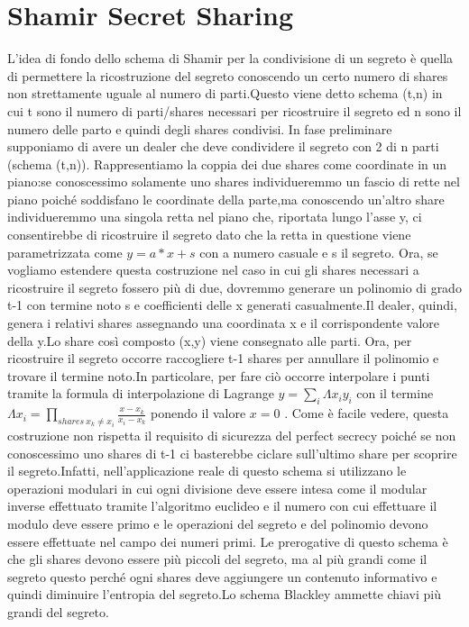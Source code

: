 \documentclass{book}
\begin{document}
\section{Shamir Secret Sharing}
L'idea di fondo dello schema di Shamir per la condivisione di un segreto è quella di permettere la ricostruzione del segreto conoscendo un certo numero di shares non strettamente uguale al numero di parti.Questo viene detto schema (t,n) in cui t sono il numero di parti/shares necessari per ricostruire il segreto ed n sono il numero delle parto e quindi degli shares condivisi\@.\newline
In fase preliminare supponiamo di avere un dealer che deve condividere il segreto con 2 di n parti (schema (t,n))\@.\newline
Rappresentiamo la coppia dei due shares come coordinate in un piano:se conoscessimo solamente uno shares individueremmo un fascio di rette nel piano poiché soddisfano le coordinate della parte,ma conoscendo un'altro share individueremmo una singola retta nel piano che, riportata lungo l'asse y, ci consentirebbe di ricostruire il segreto dato che la retta in questione viene parametrizzata come \(y=a*x+s\) con a numero casuale e s il segreto\@.\newline
Ora, se vogliamo estendere questa costruzione nel caso in cui gli shares necessari a ricostruire il segreto fossero più di due, dovremmo generare un polinomio di grado t-1 con termine noto s e coefficienti delle x generati casualmente.Il dealer, quindi, genera i relativi shares assegnando una coordinata x e il corrispondente valore della y.Lo share così composto (x,y) viene consegnato alle parti.
Ora, per ricostruire il segreto occorre raccogliere t-1 shares per annullare il polinomio e trovare il termine noto.In particolare, per fare ciò occorre interpolare i punti tramite la formula di interpolazione di Lagrange \(y=\sum_{i}\Lambda{x_{i}}y_{i}\) con il termine \(\Lambda{x_{i}}=\prod_{shares\ x_{k}\neq x_{i}}\frac{x-x_{k}}{x_{i}-x_{k}}\) ponendo il valore \(x=0\) \@.\newline
Come è facile vedere, questa costruzione non rispetta il requisito di sicurezza del perfect secrecy poiché se non conoscessimo uno shares di t-1 ci basterebbe ciclare sull'ultimo share per scoprire il segreto.Infatti, nell'applicazione reale di questo schema si utilizzano le operazioni modulari in cui ogni divisione deve essere intesa come il modular inverse effettuato tramite l'algoritmo euclideo e il numero con cui effettuare il modulo deve essere primo e le operazioni del segreto e del polinomio devono essere effettuate nel campo dei numeri primi\@.\newline
Le prerogative di questo schema è che gli shares devono essere più piccoli del segreto, ma al più grandi come il segreto questo perché ogni shares deve aggiungere un contenuto informativo e quindi diminuire l'entropia del segreto.Lo schema Blackley ammette chiavi più grandi del segreto.
\end{document}
